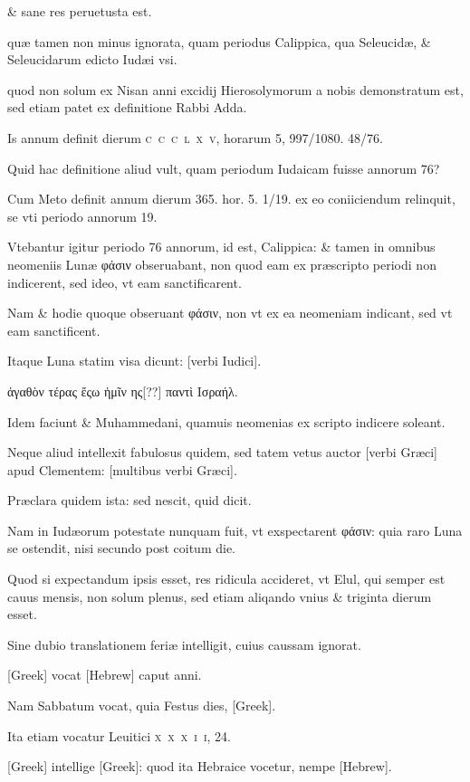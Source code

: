 \begin{parnumbers}
\& sane res peruetusta est.

quæ tamen non minus ignorata, quam periodus Calippica, qua Seleucidæ, \& Seleucidarum edicto Iudæi vsi.

quod non solum ex Nisan anni excidij Hierosolymorum a nobis demonstratum est, sed etiam patet ex definitione Rabbi Adda.

Is annum definit dierum \textsc{c~c~c~l~x~v}, horarum 5, 997/1080. 48/76.

Quid hac definitione aliud vult, quam periodum Iudaicam fuisse annorum 76?

Cum Meto definit annum dierum 365. hor. 5. 1/19. ex eo coniiciendum relinquit, se vti periodo annorum 19.

Vtebantur igitur periodo 76 annorum, id est, Calippica: \& tamen in omnibus neomeniis Lunæ \textgreek{φάσιν} obseruabant, non quod eam ex præscripto periodi non indicerent, sed ideo, vt eam sanctificarent.

Nam \& hodie quoque obseruant \textgreek{φάσιν}, non vt ex ea neomeniam indicant, sed vt eam sanctificent.

Itaque Luna statim visa dicunt: \texthebrew{} [verbi Iudici].

\textgreek{ἀγαθὸν τέρας ἔςω ἡμῖν ης[??] παντὶ Ισραήλ.}

Idem faciunt \& Muhammedani, quamuis neomenias ex scripto indicere soleant.

Neque aliud intellexit fabulosus quidem, sed tatem vetus auctor \textgreek{[verbi Græci]} apud Clementem: \textgreek{[multibus verbi Græci]}.

Præclara
quidem ista: sed nescit, quid dicit.

Nam in Iudæorum potestate nunquam fuit, vt exspectarent \textgreek{φάσιν}: quia raro Luna se ostendit, nisi secundo post coitum die.

Quod si expectandum ipsis esset, res ridicula accideret, vt Elul, qui semper est cauus mensis, non solum plenus, sed etiam aliqando vnius \& triginta dierum esset.

Sine dubio translationem feriæ intelligit, cuius caussam ignorat.

\textgreek{[Greek]} vocat \texthebrew{} [Hebrew] caput anni.

Nam Sabbatum vocat, quia Festus dies, \textgreek{[Greek]}.

Ita etiam vocatur Leuitici \textsc{x~x~x~i~i}, 24.

\textgreek{[Greek]} intellige \textgreek{[Greek]}: quod ita Hebraice vocetur, nempe \texthebrew{} [Hebrew].


\end{parnumbers}
